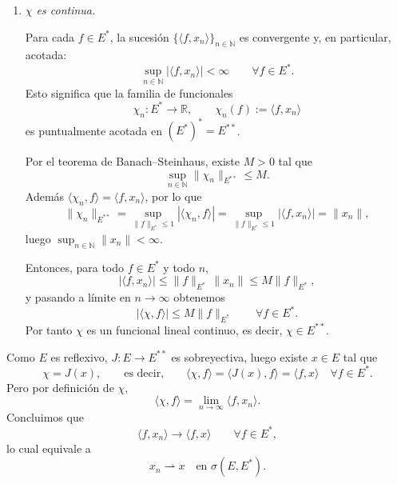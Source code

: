 \documentclass[12pt]{article}
\begin{document}
\begin{ejercicio}
\begin{enumerate}[label=\alph*)]
\begin{enumerate}
            Como para cada $n$ la aplicación $f\mapsto \langle f,x_n\rangle$ es lineal en $E^\ast$,
            el paso al límite preserva la linealidad, luego $\chi$ es lineal.
            
            \item \textit{$\chi$ es continua.}
            
            Para cada $f\in E^\ast$, la sucesión $\{\langle f,x_n\rangle\}_{n\in\mathbb{N}}$ es convergente y, en particular, acotada:
            \[
            \sup_{n\in\mathbb{N}} |\langle f,x_n\rangle| < \infty
            \qquad \forall f\in E^\ast.
            \]
            Esto significa que la familia de funcionales
            \[
            \chi_n:E^\ast\to \mathbb{R},\qquad \chi_n(f):=\langle f,x_n\rangle
            \]
            es puntualmente acotada en $(E^\ast)^\ast=E^{\ast\ast}$.
            
            Por el teorema de Banach--Steinhaus, existe $M>0$ tal que
            \[
            \sup_{n\in\mathbb{N}}\|\chi_n\|_{E^{\ast\ast}}\le M.
            \]
            Además $\langle \chi_n, f\rangle = \langle f,x_n\rangle$, por lo que
            \[
            \|\chi_n\|_{E^{\ast\ast}}
            =
            \sup_{\|f\|_{E^\ast}\le 1} |\langle \chi_n, f\rangle|
            =
            \sup_{\|f\|_{E^\ast}\le 1} |\langle f,x_n\rangle|
            =
            \|x_n\|,
            \]
            luego $\sup_{n\in\mathbb{N}} \|x_n\|<\infty$.
            
            Entonces, para todo $f\in E^\ast$ y todo $n$,
            \[
            |\langle f,x_n\rangle|\le \|f\|_{E^\ast}\,\|x_n\|\le M\|f\|_{E^\ast},
            \]
            y pasando a límite en $n\to\infty$ obtenemos
            \[
            |\langle \chi,f\rangle| \le M\|f\|_{E^\ast}\qquad \forall f\in E^\ast.
            \]
            Por tanto $\chi$ es un funcional lineal continuo, es decir, $\chi\in E^{\ast\ast}$.
            \end{enumerate}
            
            Como $E$ es reflexivo, $J:E\to E^{\ast\ast}$ es sobreyectiva, luego existe $x\in E$ tal que
            \[
            \chi = J(x),
            \qquad \text{es decir,}\qquad
            \langle \chi,f\rangle = \langle J(x),f\rangle = \langle f,x\rangle
            \quad \forall f\in E^\ast.
            \]
            Pero por definición de $\chi$,
            \[
            \langle \chi,f\rangle = \lim_{n\to\infty}\langle f,x_n\rangle.
            \]
            Concluimos que
            \[
            \langle f,x_n\rangle \longrightarrow \langle f,x\rangle
            \qquad \forall f\in E^\ast,
            \]
            lo cual equivale a
            \[
            x_n \rightharpoonup x \quad \text{en } \sigma(E,E^\ast).
            \]








\end{enumerate}
\end{ejercicio}
\end{document}
